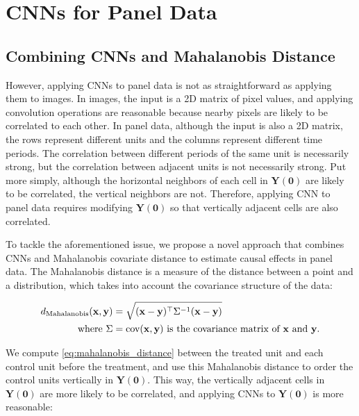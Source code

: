 \section{CNNs for Panel Data}


\subsection{Combining CNNs and Mahalanobis Distance}

However, applying CNNs to panel data is not as straightforward as applying them to images.
In images, the input is a 2D matrix of pixel values, and applying convolution operations are reasonable
because nearby pixels are likely to be correlated to each other.
In panel data, although the input is also a 2D matrix, the rows represent different units and the columns represent different time periods.
The correlation between different periods of the same unit is necessarily strong, but the correlation between adjacent units is not necessarily strong.
Put more simply, although the horizontal neighbors of each cell in $\mathbf{Y(0)}$ are likely to be correlated, the vertical neighbors are not.
Therefore, applying CNN to panel data requires modifying $\mathbf{Y(0)}$ so that vertically adjacent cells are also correlated.

To tackle the aforementioned issue, we propose a novel approach that combines CNNs and Mahalanobis covariate distance to estimate causal effects in panel data.
The Mahalanobis distance is a measure of the distance between a point and a distribution, which takes into account the covariance structure of the data:

\begin{align}
    d_{\text{Mahalanobis}}(\mathbf{x}, \mathbf{y}) &= \sqrt{(\mathbf{x} - \mathbf{y})^\top \Sigma^{-1} (\mathbf{x} - \mathbf{y})} \label{eq:mahalanobis_distance}\\
    \text{where } \Sigma &= \text{cov}(\mathbf{x}, \mathbf{y}) \text{ is the covariance matrix of } \mathbf{x} \text{ and } \mathbf{y}. \notag
\end{align}

We compute \eqref{eq:mahalanobis_distance} between the treated unit and each control unit before the treatment, 
and use this Mahalanobis distance to order the control units vertically in $\mathbf{Y(0)}$.
This way, the vertically adjacent cells in $\mathbf{Y(0)}$ are more likely to be correlated, and applying CNNs to $\mathbf{Y(0)}$ is more reasonable:

